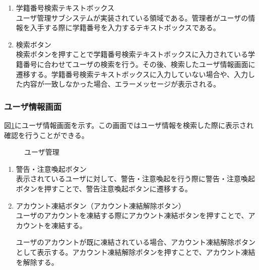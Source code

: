 \documentclass[a4j]{jarticle}
\begin{document}
\begin{enumerate}
  \renewcommand{\labelenumi}{\textcircled{\scriptsize \theenumi}}

\item 学籍番号検索テキストボックス\\
ユーザ管理サブシステムが実装されている領域である。管理者がユーザの情報を入手する際に学籍番号を入力するテキストボックスである。

\item 検索ボタン\\
検索ボタンを押すことで学籍番号検索テキストボックスに入力されている学籍番号に合わせてユーザの検索を行う。その後、検索したユーザ情報画面に遷移する。学籍番号検索テキストボックスに入力していない場合や、入力した内容が一致しなかった場合、エラーメッセージが表示される。


\end{enumerate}


\subsubsection{ユーザ情報画面}
図\ref{fig:user_info}にユーザ情報画面を示す。この画面ではユーザ情報を検索した際に表示され確認を行うことができる。
\begin{figure}[H]
\centering
{}
\caption{ユーザ管理}
\label{fig:user_info}
\end{figure}

\begin{enumerate}
  \renewcommand{\labelenumi}{\textcircled{\scriptsize \theenumi}}

\item 警告・注意喚起ボタン\\
表示されているユーザに対して、警告・注意喚起を行う際に警告・注意喚起ボタンを押すことで、警告注意喚起ボタンに遷移する。
\item アカウント凍結ボタン（アカウント凍結解除ボタン）\\
  ユーザのアカウントを凍結する際にアカウント凍結ボタンを押すことで、アカウントを凍結する。

  ユーザのアカウントが既に凍結されている場合、アカウント凍結解除ボタンとして表示する。アカウント凍結解除ボタンを押すことで、アカウント凍結を解除する。

\end{enumerate}
\end{document}
